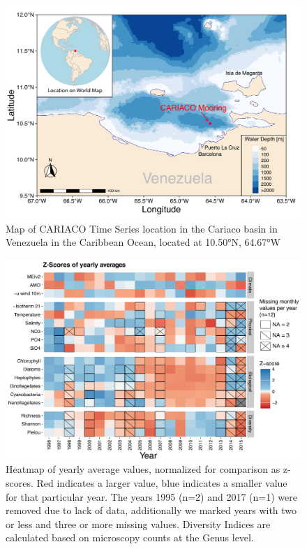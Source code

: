 \documentclass[draft]{agujournal2019}
\begin{document}
\begin{figure}
\noindent\includegraphics[width=\textwidth]{fig/Map_CAR.pdf}
\caption{Map of CARIACO Time Series location in the Cariaco basin in Venezuela in the Caribbean Ocean, located at \ang{10.50}N, \ang{64.67}W}
\label{fig:map}
\end{figure}

\begin{figure}
\noindent\includegraphics[width=\textwidth]{fig/PLOTZScores_updated.pdf}
\caption{Heatmap of yearly average values, normalized for comparison as z-scores. Red indicates a larger value, blue indicates a smaller value for that particular year. The years 1995 (n=2) and 2017 (n=1) were removed due to lack of data, additionally we marked years with two or less and three or more missing values. Diversity Indices are calculated based on microscopy counts at the Genus level.}
\label{fig:zscore}
\end{figure}
\end{document}
